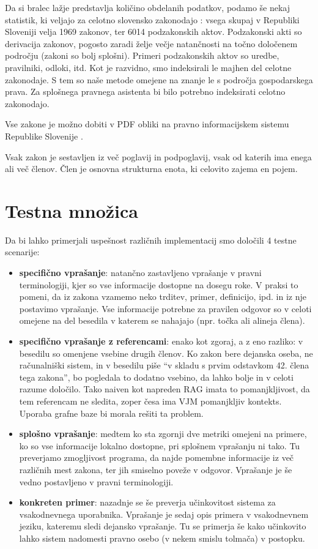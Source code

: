 \documentclass[a4paper,12pt,openright]{book}
\begin{document}
Da si bralec lažje predstavlja količino obdelanih podatkov, podamo še nekaj statistik, ki veljajo za celotno slovensko zakonodajo \cite{pisrs_stats}: vsega skupaj v Republiki Sloveniji velja 1969 zakonov, ter 6014 podzakonskih aktov. Podzakonski akti so derivacija zakonov, pogosto zaradi želje večje natančnosti na točno določenem področju (zakoni so bolj splošni). Primeri podzakonskih aktov so uredbe, pravilniki, odloki, itd. Kot je razvidno, smo indeksirali le majhen del celotne zakonodaje. S tem so naše metode omejene na znanje le s področja gospodarskega prava. Za splošnega pravnega asistenta bi bilo potrebno indeksirati celotno zakonodajo.

Vse zakone je možno dobiti v PDF obliki na pravno informacijskem sistemu Republike Slovenije \cite{pisrs}.

Vsak zakon je sestavljen iz več poglavij in podpoglavij, vsak od katerih ima enega ali več členov. Člen je osnovna strukturna enota, ki celovito zajema en pojem.

\section{Testna množica}

Da bi lahko primerjali uspešnost različnih implementacij smo določili 4 testne scenarije:

\begin{itemize}
    \item \textbf{specifično vprašanje}: natančno zastavljeno vprašanje v pravni terminologiji, kjer so vse informacije dostopne na dosegu roke. V praksi to pomeni, da iz zakona vzamemo neko trditev, primer, definicijo, ipd. in iz nje postavimo vprašanje. Vse informacije potrebne za pravilen odgovor so v celoti omejene na del besedila v katerem se nahajajo (npr. točka ali alineja člena).
    \item \textbf{specifično vprašanje z referencami}: enako kot zgoraj, a z eno razliko: v besedilu so omenjene vsebine drugih členov. Ko zakon bere dejanska oseba, ne računalniški sistem, in v besedilu piše “v skladu s prvim odstavkom 42. člena tega zakona”, bo pogledala to dodatno vsebino, da lahko bolje in v celoti razume določilo. Tako naiven kot napreden RAG imata to pomanjkljivost, da tem referencam ne sledita, zoper česa ima VJM pomanjkljiv kontekts. Uporaba grafne baze bi morala rešiti ta problem.
    \item \textbf{splošno vprašanje}: medtem ko sta zgornji dve metriki omejeni na primere, ko so vse informacije lokalno dostopne, pri splošnem vprašanju ni tako. Tu preverjamo zmogljivost programa, da najde pomembne informacije iz več različnih mest zakona, ter jih smiselno poveže v odgovor. Vprašanje je še vedno postavljeno v pravni terminologiji.
    \item \textbf{konkreten primer}: nazadnje se še preverja učinkovitost sistema za vsakodnevnega uporabnika. Vprašanje je sedaj opis primera v vsakodnevnem jeziku, kateremu sledi dejansko vprašanje. Tu se primerja še kako učinkovito lahko sistem nadomesti pravno osebo (v nekem smislu tolmača) v postopku.
\end{itemize}
\end{document}
